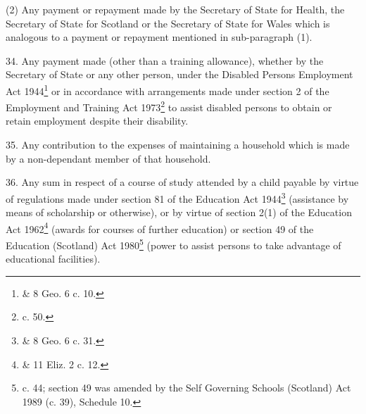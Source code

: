 \documentclass[a4paper]{article}
\begin{document}
(2) Any payment or repayment made by the Secretary of State for Health, the Secretary of State for Scotland or the Secretary of State for Wales which is analogous to a payment or repayment mentioned in sub-paragraph (1).

\medskip

34.  Any payment made (other than a training allowance), whether by the Secretary of State or any other person, under the Disabled Persons Employment Act 1944\footnote{ \& 8 Geo. 6 c. 10.} or in accordance with arrangements made under section 2 of the Employment and Training Act 1973\footnote{ c. 50.} to assist disabled persons to obtain or retain employment despite their disability.

\medskip

35.  Any contribution to the expenses of maintaining a household which is made by a non-dependant member of that household.

\medskip

36.  Any sum in respect of a course of study attended by a child payable by virtue of regulations made under section 81 of the Education Act 1944\footnote{ \& 8 Geo. 6 c. 31.} (assistance by means of scholarship or otherwise), or by virtue of section 2(1) of the Education Act 1962\footnote{ \& 11 Eliz. 2 c. 12.} (awards for courses of further education) or section 49 of the Education (Scotland) Act 1980\footnote{ c. 44; section 49 was amended by the Self Governing Schools (Scotland) Act 1989 (c. 39), Schedule 10.} (power to assist persons to take advantage of educational facilities).

\medskip
\end{document}
